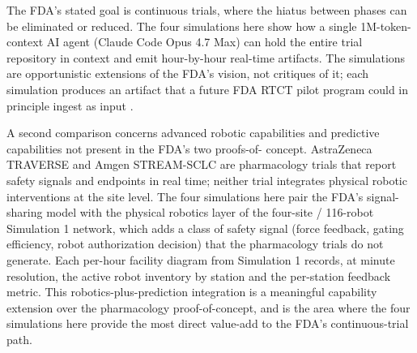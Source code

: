 The FDA's stated goal is continuous trials, where the hiatus between
phases can be eliminated or reduced. The four simulations here show
how a single 1M-token-context AI agent (Claude Code Opus 4.7 Max) can
hold the entire trial repository in context and emit hour-by-hour
real-time artifacts. The simulations are opportunistic extensions of
the FDA's vision, not critiques of it; each simulation produces an
artifact that a future FDA RTCT pilot program could in principle
ingest as input \cite{kawchak_2026_19176370,
kawchak_2026_19119939, kawchak_2026_19396256}.

A second comparison concerns advanced robotic capabilities and
predictive capabilities not present in the FDA's two proofs-of-
concept. AstraZeneca TRAVERSE and Amgen STREAM-SCLC are pharmacology
trials that report safety signals and endpoints in real time; neither
trial integrates physical robotic interventions at the site level.
The four simulations here pair the FDA's signal-sharing model with
the physical robotics layer of the four-site / 116-robot Simulation 1
network, which adds a class of safety signal (force feedback, gating
efficiency, robot authorization decision) that the pharmacology
trials do not generate. Each per-hour facility diagram from
Simulation 1 records, at minute resolution, the active robot
inventory by station and the per-station feedback metric. This
robotics-plus-prediction integration is a meaningful capability
extension over the pharmacology proof-of-concept, and is the area
where the four simulations here provide the most direct value-add to
the FDA's continuous-trial path.

